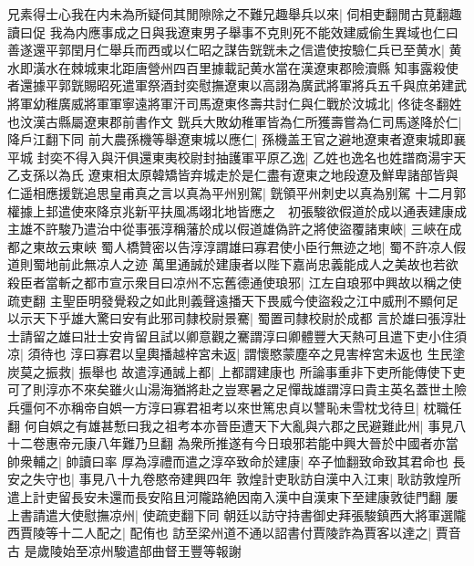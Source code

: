 兄素得士心我在内未為所疑伺其閒隙除之不難兄趣舉兵以來|{
	伺相吏翻閒古莧翻趣讀曰促}
我為内應事成之日與我遼東男子舉事不克則死不能效建威偷生異域也仁曰善遂還平郭閏月仁舉兵而西或以仁昭之謀告皝皝未之信遣使按驗仁兵已至黄水|{
	黄水即潢水在棘城東北距唐營州四百里據載記黄水當在漢遼東郡險瀆縣}
知事露殺使者還據平郭皝賜昭死遣軍祭酒封奕慰撫遼東以高詡為廣武將軍將兵五千與庶弟建武將軍幼稚廣威將軍軍寧遠將軍汗司馬遼東佟壽共討仁與仁戰於汶城北|{
	佟徒冬翻姓也汶漢古縣屬遼東郡前書作文}
皝兵大敗幼稚軍皆為仁所獲壽嘗為仁司馬遂降於仁|{
	降戶江翻下同}
前大農孫機等舉遼東城以應仁|{
	孫機盖王官之避地遼東者遼東城即襄平城}
封奕不得入與汗俱還東夷校尉封抽護軍平原乙逸|{
	乙姓也逸名也姓譜商湯宇天乙支孫以為氏}
遼東相太原韓矯皆弃城走於是仁盡有遼東之地段遼及鮮卑諸部皆與仁遥相應援皝追思皇甫真之言以真為平州别駕|{
	皝領平州刺史以真為别駕}
十二月郭權據上邽遣使來降京兆新平扶風馮翊北地皆應之　初張駿欲假道於成以通表建康成主雄不許駿乃遣治中從事張淳稱藩於成以假道雄偽許之將使盜覆諸東峽|{
	三峽在成都之東故云東峽}
蜀人橋贊密以告淳淳謂雄曰寡君使小臣行無迹之地|{
	蜀不許凉人假道則蜀地前此無凉人之迹}
萬里通誠於建康者以陛下嘉尚忠義能成人之美故也若欲殺臣者當斬之都市宣示衆目曰凉州不忘舊德通使琅邪|{
	江左自琅邪中興故以稱之使疏吏翻}
主聖臣明發覺殺之如此則義聲遠播天下畏威今使盜殺之江中威刑不顯何足以示天下乎雄大驚曰安有此邪司隸校尉景騫|{
	蜀置司隸校尉於成都}
言於雄曰張淳壯士請留之雄曰壯士安肯留且試以卿意觀之騫謂淳曰卿體豐大天熱可且遣下吏小住須凉|{
	須待也}
淳曰寡君以皇輿播越梓宮未返|{
	謂懷愍蒙塵卒之見害梓宮未返也}
生民塗炭莫之振救|{
	振舉也}
故遣淳通誠上都|{
	上都謂建康也}
所論事重非下吏所能傳使下吏可了則淳亦不來矣雖火山湯海猶將赴之豈寒暑之足憚哉雄謂淳曰貴主英名蓋世土險兵彊何不亦稱帝自娯一方淳曰寡君祖考以來世篤忠貞以讐恥未雪枕戈待旦|{
	枕職任翻}
何自娯之有雄甚慙曰我之祖考本亦晉臣遭天下大亂與六郡之民避難此州|{
	事見八十二卷惠帝元康八年難乃旦翻}
為衆所推遂有今日琅邪若能中興大晉於中國者亦當帥衆輔之|{
	帥讀曰率}
厚為淳禮而遣之淳卒致命於建康|{
	卒子恤翻致命致其君命也}
長安之失守也|{
	事見八十九卷愍帝建興四年}
敦煌計吏耿訪自漢中入江東|{
	耿訪敦煌所遣上計吏留長安未還而長安陷且河隴路絶因南入漢中自漢東下至建康敦徒門翻}
屢上書請遣大使慰撫凉州|{
	使疏吏翻下同}
朝廷以訪守持書御史拜張駿鎮西大將軍選隴西賈陵等十二人配之|{
	配侑也}
訪至梁州道不通以詔書付賈陵詐為賈客以達之|{
	賈音古}
是歲陵始至凉州駿遣部曲督王豐等報謝

